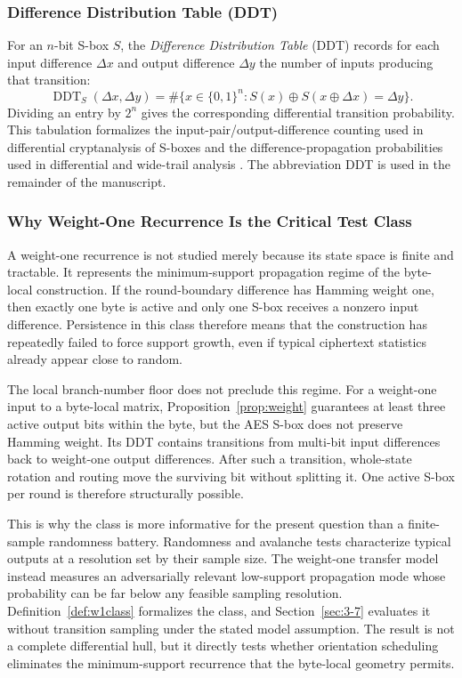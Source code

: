 \documentclass[cryptography,article,submit,oneauthor]{Definitions/mdpi}
\begin{document}
\subsubsection{Difference Distribution Table (DDT)}\label{sec:3-6-ddt}
For an $n$-bit S-box $S$, the \emph{Difference Distribution Table} (DDT) records for each input difference $\Delta x$ and output difference $\Delta y$ the number of inputs producing that transition:
\begin{equation}
\operatorname{DDT}_{S}(\Delta x,\Delta y)
= \#\{x\in\{0,1\}^{n}: S(x)\oplus S(x\oplus\Delta x)=\Delta y\}.
\label{eq:ddt}
\end{equation}
Dividing an entry by $2^n$ gives the corresponding differential transition
probability. This tabulation formalizes the input-pair/output-difference counting used
in differential cryptanalysis of S-boxes and the difference-propagation probabilities
used in differential and wide-trail analysis \cite{ref55,ref51,ref21}. The abbreviation DDT is used in the
remainder of the manuscript.

\subsubsection{Why Weight-One Recurrence Is the Critical Test Class}\label{sec:3-6-trails}
A weight-one recurrence is not studied merely because its state space is finite and tractable. It represents the minimum-support propagation regime of the byte-local construction. If the round-boundary difference has Hamming weight one, then exactly one byte is active and only one S-box receives a nonzero input difference. Persistence in this class therefore means that the construction has repeatedly failed to force support growth, even if typical ciphertext statistics already appear close to random.

The local branch-number floor does not preclude this regime. For a weight-one input to a byte-local matrix, Proposition~\ref{prop:weight} guarantees at least three active output bits within the byte, but the AES S-box does not preserve Hamming weight. Its DDT contains transitions from multi-bit input differences back to weight-one output differences. After such a transition, whole-state rotation and routing move the surviving bit without splitting it. One active S-box per round is therefore structurally possible.

This is why the class is more informative for the present question than a finite-sample randomness battery. Randomness and avalanche tests characterize typical outputs at a resolution set by their sample size. The weight-one transfer model instead measures an adversarially relevant low-support propagation mode whose probability can be far below any feasible sampling resolution. Definition~\ref{def:w1class} formalizes the class, and Section~\ref{sec:3-7} evaluates it without transition sampling under the stated model assumption. The result is not a complete differential hull, but it directly tests whether orientation scheduling eliminates the minimum-support recurrence that the byte-local geometry permits.
\end{document}
